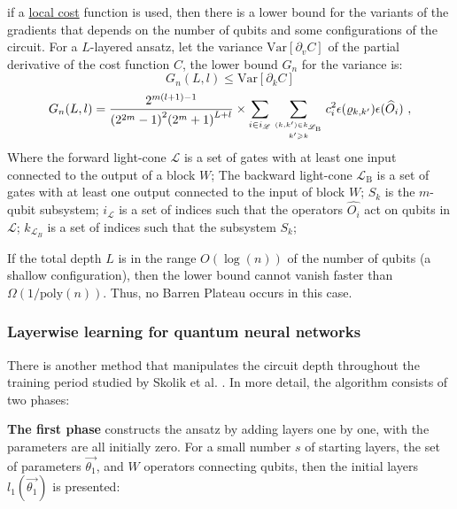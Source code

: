 if a \underline{local cost} function is used, then there is a lower bound for the variants of the gradients that depends on the number of qubits and some configurations of the circuit. 
For a $L$-layered ansatz, let the variance $\mathrm{Var}[\partial_v C]$ of the partial derivative of the cost function $C$, the lower bound $G_n$ for the variance is:
\begin{equation}
    G_n(L,l) \leq \mathrm{Var}[\partial_k C]
\end{equation}
\begin{equation}
    G_n(L,l) = \frac{{2}^{m(l+1)-1}}{{({2}^{2m}-1)}^{2}{({2}^{m}+1)}^{L+l}}
    \times \mathop{\sum}\limits_{i\in {i}_{{\mathcal{L}}}}\mathop{\sum}\limits _{{(k,k^{\prime} )\in {k}_{{{\mathcal{L}}}_{\text{B}}}}\atop {k^{\prime} \geqslant k}}{c}_{i}^{2}\epsilon ({\rho }_{k,k^{\prime} })\epsilon ({\widehat{O}}_{i})\ ,
\end{equation}
Where the forward light-cone $\mathcal{L}$ is a set of gates with at least one input connected to the output of a block $W$; 
The backward light-cone $\mathcal{L}_\text{B}$ is a set of gates with at least one output connected to the input of block $W$;
$S_k$ is the $m$-qubit subsystem;
$i_{\mathcal{L}}$ is a set of indices such that the operators $\hat{O_i}$ act on qubits in $\mathcal{L}$;
$k_{\mathcal{L}_B}$ is a set of indices such that the subsystem $S_k$;

If the total depth $L$ is in the range $O(\log(n))$ of the number of qubits (a shallow configuration), then the lower bound cannot vanish faster than $\Omega(1/\mathrm{poly}(n))$. 
Thus, no Barren Plateau occurs in this case.



\subsubsection{Layerwise learning for quantum neural networks}

There is another method that manipulates the circuit depth throughout the training period studied by Skolik et al. \cite{skolikLayerwiseLearningQuantum2021}. 
In more detail, the algorithm consists of two phases:

\textbf{The first phase} constructs the ansatz by adding layers one by one, with the parameters are all initially zero. For a small number $s$ of starting layers, the set of parameters $\vec{\theta_1}$, and $W$ operators connecting qubits, then the initial layers $l_1(\vec{\theta_1})$ is presented:

